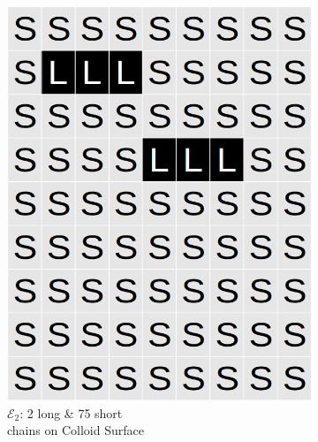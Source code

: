 \documentclass[journal=mamobx,manuscript=article]{achemso}
\begin{document}
\begin{figure}[H]
\begin{subfigure}[b]{0.4\textwidth}
        \includegraphics[scale=0.15]{fig8c.png}
        \caption{$\mathcal{E}_2$: 2 long \& 75 short \\chains on Colloid Surface}
        \label{fig:C}
    \end{subfigure}
    \begin{subfigure}[b]{0.4\textwidth}

\end{subfigure}
\end{figure}
\end{document}
